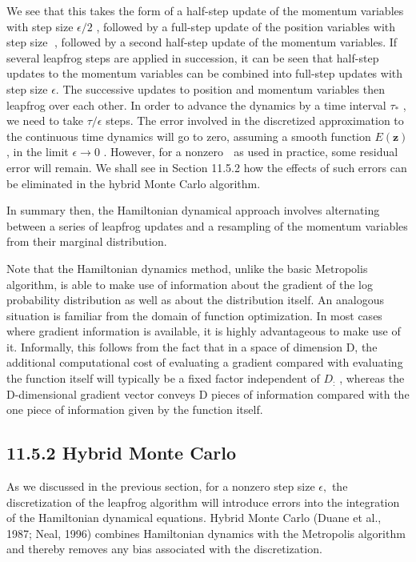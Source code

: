 \documentclass[
  10
]{article}
\begin{document}
We see that this takes the form of a half-step update of the momentum
variables with step size \(\epsilon / 2\) , followed by a full-step
update of the position variables with step size , followed by a second
half-step update of the momentum variables. If several leapfrog steps
are applied in succession, it can be seen that half-step updates to the
momentum variables can be combined into full-step updates with step size
\(\epsilon .\) The successive updates to position and momentum variables
then leapfrog over each other. In order to advance the dynamics by a
time interval \(\tau _ { \ast }\) , we need to take \(\tau / \epsilon\)
steps. The error involved in the discretized approximation to the
continuous time dynamics will go to zero, assuming a smooth function
\(E ( \mathbf { z } )\) , in the limit \(\epsilon \to 0\) . However, for
a nonzero  as used in practice, some residual error will remain. We
shall see in Section 11.5.2 how the effects of such errors can be
eliminated in the hybrid Monte Carlo algorithm.

In summary then, the Hamiltonian dynamical approach involves alternating
between a series of leapfrog updates and a resampling of the momentum
variables from their marginal distribution.

Note that the Hamiltonian dynamics method, unlike the basic Metropolis
algorithm, is able to make use of information about the gradient of the
log probability distribution as well as about the distribution itself.
An analogous situation is familiar from the domain of function
optimization. In most cases where gradient information is available, it
is highly advantageous to make use of it. Informally, this follows from
the fact that in a space of dimension D, the additional computational
cost of evaluating a gradient compared with evaluating the function
itself will typically be a fixed factor independent of \(D _ { : }\) ,
whereas the D-dimensional gradient vector conveys D pieces of
information compared with the one piece of information given by the
function itself.

\subsection{11.5.2 Hybrid Monte Carlo}\label{hybrid-monte-carlo}

As we discussed in the previous section, for a nonzero step size
\(\epsilon ,\) the discretization of the leapfrog algorithm will
introduce errors into the integration of the Hamiltonian dynamical
equations. Hybrid Monte Carlo (Duane et al., 1987; Neal, 1996) combines
Hamiltonian dynamics with the Metropolis algorithm and thereby removes
any bias associated with the discretization.
\end{document}
